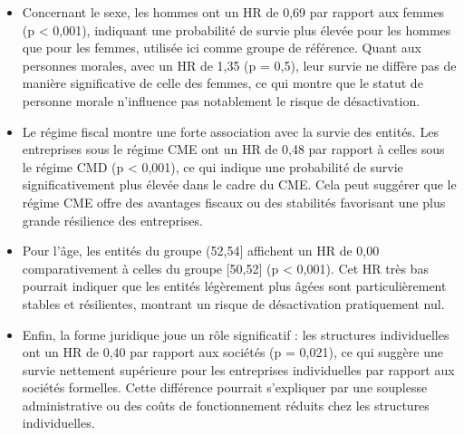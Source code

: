 \documentclass[a4paper,12pt]{report}
\begin{document}
\noindent
\begin{itemize}
    \item Concernant le sexe, les hommes ont un HR de 0,69 par rapport aux femmes (p < 0,001), indiquant une probabilité de survie plus élevée pour les hommes que pour les femmes, utilisée ici comme groupe de référence. Quant aux personnes morales, avec un HR de 1,35 (p = 0,5), leur survie ne diffère pas de manière significative de celle des femmes, ce qui montre que le statut de personne morale n’influence pas notablement le risque de désactivation.

    \item Le régime fiscal montre une forte association avec la survie des entités. Les entreprises sous le régime CME ont un HR de 0,48 par rapport à celles sous le régime CMD (p < 0,001), ce qui indique une probabilité de survie significativement plus élevée dans le cadre du CME. Cela peut suggérer que le régime CME offre des avantages fiscaux ou des stabilités favorisant une plus grande résilience des entreprises.

    \item Pour l’âge, les entités du groupe (52,54] affichent un HR de 0,00 comparativement à celles du groupe [50,52] (p < 0,001). Cet HR très bas pourrait indiquer que les entités légèrement plus âgées sont particulièrement stables et résilientes, montrant un risque de désactivation pratiquement nul.

    \item Enfin, la forme juridique joue un rôle significatif : les structures individuelles ont un HR de 0,40 par rapport aux sociétés (p = 0,021), ce qui suggère une survie nettement supérieure pour les entreprises individuelles par rapport aux sociétés formelles. Cette différence pourrait s’expliquer par une souplesse administrative ou des coûts de fonctionnement réduits chez les structures individuelles.
\end{itemize}
\end{document}

